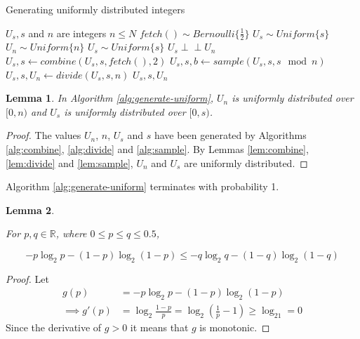 \documentclass[12pt]{article}
\newtheorem{lemma}{Lemma}
\newcommand{\indep}{\perp\!\!\!\perp}
\begin{document}
\begin{algorithm}
\caption{Generating uniformly distributed integers}
\label{alg:generate-uniform}
\begin{algorithmic}[1]
\Require $U_s, s$ and $n$ are integers
\Require $n \le N$
\Require $fetch() \sim Bernoulli\{\frac{1}{2}\}$
\Require $U_s \sim Uniform\{s\}$
\Ensure $U_n \sim Uniform\{n\}$
\Ensure $U_s \sim Uniform\{s\}$
\Ensure $U_s \indep U_n$
        \State $U_s, s \gets combine(U_s, s, fetch(), 2)$
    \EndWhile
    \State $U_s, s, b \gets sample(U_s, s, s \mod n)$ 
        \State $U_s, s, U_n \gets divide(U_s, s, n)$
        \State \Return $U_s, s, U_n$
    \EndIf
  \EndWhile
\EndProcedure
\end{algorithmic}
\end{algorithm}

\begin{lemma}
    In Algorithm \ref{alg:generate-uniform}, 
$U_n$ is uniformly distributed over $[0,n)$ and 
$U_s$ is uniformly distributed over $[0,s)$.
\end{lemma}

\begin{proof}
The values $U_n$, $n$, $U_s$ and $s$ have been generated by Algorithms \ref{alg:combine}, \ref{alg:divide} and \ref{alg:sample}. By Lemmas \ref{lem:combine}, \ref{lem:divide} and \ref{lem:sample}, $U_n$ and $U_s$ are uniformly distributed.
\end{proof}

Algorithm \ref{alg:generate-uniform} terminates with probability 1.

\begin{lemma}
    \label{lem:shannon-inequality}

For $p,q \in \mathbb{R}$, where $0 \le p\le q \le 0.5$, 

\begin{equation}
-p\log_2 p - (1-p)\log_2(1-p) \le -q\log_2 q - (1-q)\log_2(1-q)
\end{equation}
\end{lemma}

\begin{proof}
    Let
    \begin{align}
        g(p) & = -p\log_2 p - (1-p)\log_2(1-p) \\
        \implies g'(p) & = \log_2\frac{1-p}{p} = \log_2(\frac{1}{p}-1) \ge \log_21 = 0 
    \end{align}
Since the derivative of $g>0$ it means that $g$ is monotonic.
\end{proof}
\end{document}
